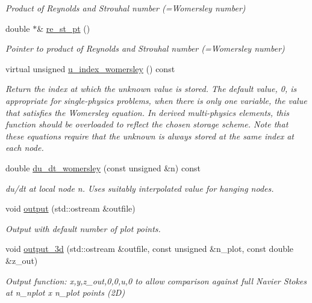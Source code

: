 \begin{DoxyCompactItemize}
\begin{DoxyCompactList}\small\item\em Product of Reynolds and Strouhal number (=Womersley number) \end{DoxyCompactList}\item 
double $\ast$\& \hyperlink{classoomph_1_1WomersleyEquations_aaca21f4cfb0b6614b9b796073ce9c8b8}{re\+\_\+st\+\_\+pt} ()
\begin{DoxyCompactList}\small\item\em Pointer to product of Reynolds and Strouhal number (=Womersley number) \end{DoxyCompactList}\item 
virtual unsigned \hyperlink{classoomph_1_1WomersleyEquations_afd739de1c8e01b1d9409c05db9ced366}{u\+\_\+index\+\_\+womersley} () const
\begin{DoxyCompactList}\small\item\em Return the index at which the unknown value is stored. The default value, 0, is appropriate for single-\/physics problems, when there is only one variable, the value that satisfies the Womersley equation. In derived multi-\/physics elements, this function should be overloaded to reflect the chosen storage scheme. Note that these equations require that the unknown is always stored at the same index at each node. \end{DoxyCompactList}\item 
double \hyperlink{classoomph_1_1WomersleyEquations_a6012a6010fc26e347214492f6c590e74}{du\+\_\+dt\+\_\+womersley} (const unsigned \&n) const
\begin{DoxyCompactList}\small\item\em du/dt at local node n. Uses suitably interpolated value for hanging nodes. \end{DoxyCompactList}\item 
void \hyperlink{classoomph_1_1WomersleyEquations_a9c1246d883f937888bf052b7078aee9a}{output} (std\+::ostream \&outfile)
\begin{DoxyCompactList}\small\item\em Output with default number of plot points. \end{DoxyCompactList}\item 
void \hyperlink{classoomph_1_1WomersleyEquations_af97b58e933b49d84f2eda3c10fec9cd1}{output\+\_\+3d} (std\+::ostream \&outfile, const unsigned \&n\+\_\+plot, const double \&z\+\_\+out)
\begin{DoxyCompactList}\small\item\em Output function\+: x,y,z\+\_\+out,0,0,u,0 to allow comparison against full Navier Stokes at n\+\_\+nplot x n\+\_\+plot points (2D) \end{DoxyCompactList}\item 

\end{DoxyCompactItemize}
